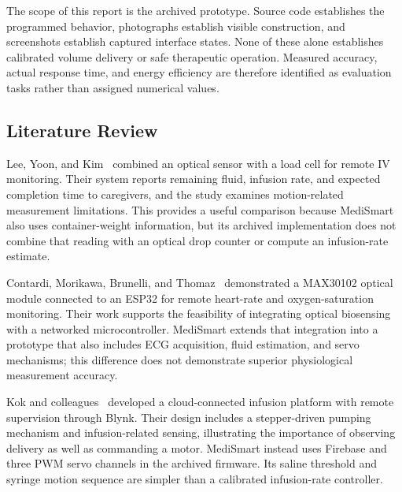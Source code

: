 The scope of this report is the archived prototype. Source code establishes the programmed behavior, photographs establish visible construction, and screenshots establish captured interface states. None of these alone establishes calibrated volume delivery or safe therapeutic operation. Measured accuracy, actual response time, and energy efficiency are therefore identified as evaluation tasks rather than assigned numerical values.

\subsection{Literature Review}
Lee, Yoon, and Kim~\cite{lee2021} combined an optical sensor with a load cell for remote IV monitoring. Their system reports remaining fluid, infusion rate, and expected completion time to caregivers, and the study examines motion-related measurement limitations. This provides a useful comparison because MediSmart also uses container-weight information, but its archived implementation does not combine that reading with an optical drop counter or compute an infusion-rate estimate.

Contardi, Morikawa, Brunelli, and Thomaz~\cite{contardi2022} demonstrated a MAX30102 optical module connected to an ESP32 for remote heart-rate and oxygen-saturation monitoring. Their work supports the feasibility of integrating optical biosensing with a networked microcontroller. MediSmart extends that integration into a prototype that also includes ECG acquisition, fluid estimation, and servo mechanisms; this difference does not demonstrate superior physiological measurement accuracy.

Kok and colleagues~\cite{kok2024} developed a cloud-connected infusion platform with remote supervision through Blynk. Their design includes a stepper-driven pumping mechanism and infusion-related sensing, illustrating the importance of observing delivery as well as commanding a motor. MediSmart instead uses Firebase and three PWM servo channels in the archived firmware. Its saline threshold and syringe motion sequence are simpler than a calibrated infusion-rate controller.


